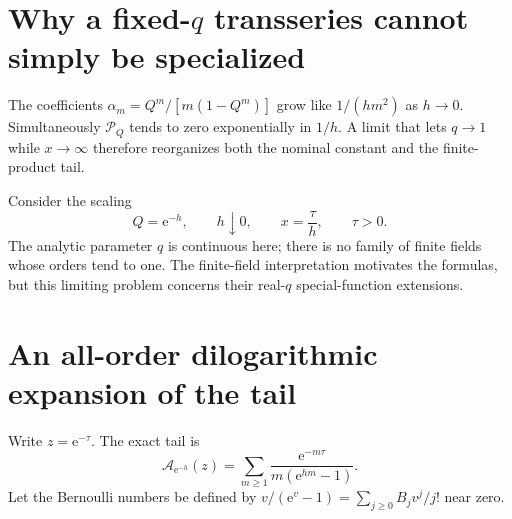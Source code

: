 \documentclass[11pt,openany]{book}
\numberwithin{equation}{chapter}
\theoremstyle{plain}
\theoremstyle{definition}
\theoremstyle{remark}
\newcommand{\ee}{\mathrm e}
\newcommand{\Pinf}{\mathcal P_Q}
\begin{document}
\label{t3:sec:double}

\section{Why a fixed-\texorpdfstring{$q$}{q} transseries cannot simply be specialized}

The coefficients $\alpha_m=Q^m/[m(1-Q^m)]$ grow like $1/(hm^2)$ as $h\to0$. Simultaneously $\Pinf$ tends to zero exponentially in $1/h$. A limit that lets $q\to1$ while $x\to\infty$ therefore reorganizes both the nominal constant and the finite-product tail.

Consider the scaling
\begin{equation}\label{t3:eq:double-scaling}
 Q=\ee^{-h},\qquad h\downarrow0,\qquad x=\frac\tau h,
 \qquad \tau>0.
\end{equation}
The analytic parameter $q$ is continuous here; there is no family of finite fields whose orders tend to one. The finite-field interpretation motivates the formulas, but this limiting problem concerns their real-$q$ special-function extensions.

\section{An all-order dilogarithmic expansion of the tail}

Write $z=\ee^{-\tau}$. The exact tail is
\begin{equation}\label{t3:eq:double-Aexact}
 \mathcal A_{\ee^{-h}}(z)
 =\sum_{m\ge1}\frac{\ee^{-m\tau}}{m(\ee^{hm}-1)}.
\end{equation}
Let the Bernoulli numbers be defined by
$v/(\ee^v-1)=\sum_{j\ge0}B_jv^j/j!$ near zero.
\end{document}
